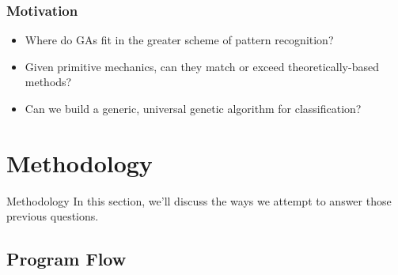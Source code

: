 \documentclass{beamer}
\begin{document}
\begin{frame} \frametitle{Motivation}
\begin{itemize}
	\item Where do GAs fit in the greater scheme of pattern recognition?
	\item Given primitive mechanics, can they match or exceed theoretically-based methods?
	\item Can we build a generic, universal genetic algorithm for classification?
\end{itemize}

\end{frame}
\section{Methodology}

\begin{frame}{Methodology}
In this section, we'll discuss the ways we attempt to answer those previous questions.
\end{frame}

\subsection{Program Flow}
\end{document}
